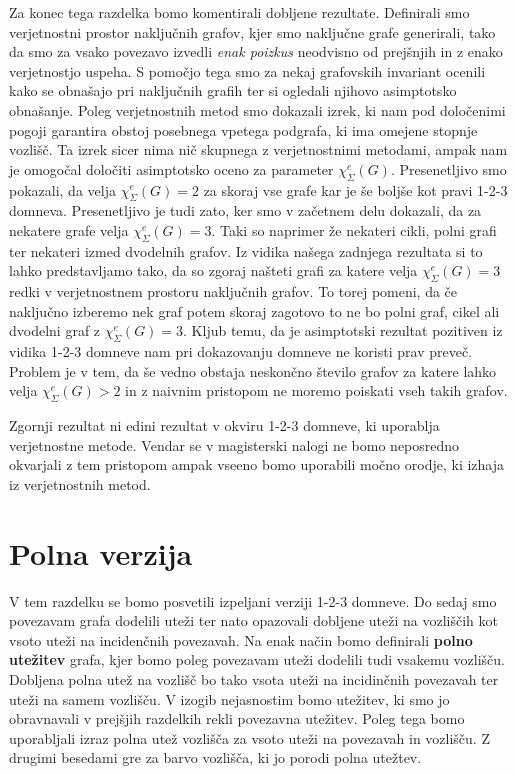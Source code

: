 \documentclass[12pt,a4paper,twoside]{article}
\theoremstyle{definition} %
\theoremstyle{plain} %
\newcommand{\ec}{\chi_{\Sigma}^e}
\numberwithin{equation}{section}  %
\begin{document}
Za konec tega razdelka bomo komentirali dobljene rezultate. Definirali smo verjetnostni prostor naključnih grafov, kjer smo naključne grafe generirali, tako da smo za vsako povezavo izvedli \textit{enak poizkus} neodvisno od prejšnjih in z enako verjetnostjo uspeha. S pomočjo tega smo za nekaj grafovskih invariant ocenili kako se obnašajo pri naključnih grafih ter si ogledali njihovo asimptotsko obnašanje. Poleg verjetnostnih metod smo dokazali izrek, ki nam pod določenimi pogoji garantira obstoj posebnega vpetega podgrafa, ki ima omejene stopnje vozlišč. Ta izrek sicer nima nič skupnega z verjetnostnimi metodami, ampak nam je omogočal določiti asimptotsko oceno za parameter $\ec(G)$. Presenetljivo smo pokazali, da velja $\ec(G) = 2$ za skoraj vse grafe kar je še boljše kot pravi 1-2-3 domneva. Presenetljivo je tudi zato, ker smo v začetnem delu dokazali, da za nekatere grafe velja $\ec(G) = 3$. Taki so naprimer že nekateri cikli, polni grafi ter nekateri izmed dvodelnih grafov. Iz vidika našega zadnjega rezultata si to lahko predstavljamo tako, da so zgoraj našteti grafi za katere velja $\ec(G) = 3$ redki v verjetnostnem prostoru naključnih grafov. To torej pomeni, da če naključno izberemo nek graf potem skoraj zagotovo to ne bo polni graf, cikel ali dvodelni graf z $\ec(G) = 3$. Kljub temu, da je asimptotski rezultat pozitiven iz vidika 1-2-3 domneve nam pri dokazovanju domneve ne koristi prav preveč. Problem je v tem, da še vedno obstaja neskončno število grafov za katere lahko velja $\ec(G) > 2$ in z naivnim pristopom ne moremo poiskati vseh takih grafov.

Zgornji rezultat ni edini rezultat v okviru 1-2-3 domneve, ki uporablja verjetnostne metode. Vendar se v magisterski nalogi ne bomo neposredno okvarjali z tem pristopom ampak vseeno bomo uporabili močno orodje, ki izhaja iz verjetnostnih metod.

\section{Polna verzija}
V tem razdelku se bomo posvetili izpeljani verziji 1-2-3 domneve. Do sedaj smo povezavam grafa dodelili uteži ter nato opazovali dobljene uteži na vozliščih kot vsoto uteži na incidenčnih povezavah. Na enak način bomo definirali \textbf{polno utežitev} grafa, kjer bomo poleg povezavam uteži dodelili tudi vsakemu vozlišču. Dobljena polna utež na vozlišč bo tako vsota uteži na incidinčnih povezavah ter uteži na samem vozlišču. V izogib nejasnostim bomo utežitev, ki smo jo obravnavali v prejšjih razdelkih rekli povezavna utežitev. Poleg tega bomo uporabljali izraz polna utež vozlišča za vsoto uteži na povezavah in vozlišču. Z drugimi besedami gre za barvo vozlišča, ki jo porodi polna utežtev.
\end{document}
